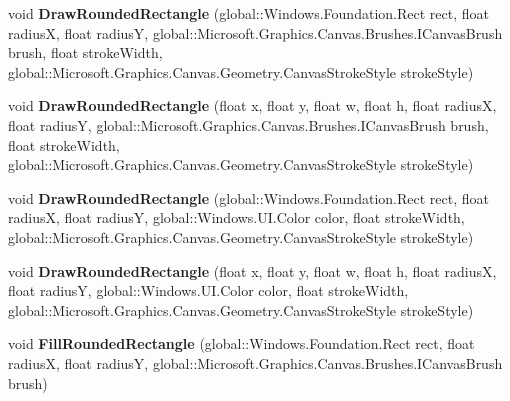 \begin{DoxyCompactItemize}
void {\bfseries Draw\+Rounded\+Rectangle} (global\+::\+Windows.\+Foundation.\+Rect rect, float radiusX, float radiusY, global\+::\+Microsoft.\+Graphics.\+Canvas.\+Brushes.\+I\+Canvas\+Brush brush, float stroke\+Width, global\+::\+Microsoft.\+Graphics.\+Canvas.\+Geometry.\+Canvas\+Stroke\+Style stroke\+Style)
\item 
\mbox{\label{class_microsoft_1_1_graphics_1_1_canvas_1_1_canvas_drawing_session_ab184d8260f42bc55d595aeb5bf73d38d}} 
void {\bfseries Draw\+Rounded\+Rectangle} (float x, float y, float w, float h, float radiusX, float radiusY, global\+::\+Microsoft.\+Graphics.\+Canvas.\+Brushes.\+I\+Canvas\+Brush brush, float stroke\+Width, global\+::\+Microsoft.\+Graphics.\+Canvas.\+Geometry.\+Canvas\+Stroke\+Style stroke\+Style)
\item 
\mbox{\label{class_microsoft_1_1_graphics_1_1_canvas_1_1_canvas_drawing_session_a3756840b08809835506655a6b68d93a3}} 
void {\bfseries Draw\+Rounded\+Rectangle} (global\+::\+Windows.\+Foundation.\+Rect rect, float radiusX, float radiusY, global\+::\+Windows.\+U\+I.\+Color color, float stroke\+Width, global\+::\+Microsoft.\+Graphics.\+Canvas.\+Geometry.\+Canvas\+Stroke\+Style stroke\+Style)
\item 
\mbox{\label{class_microsoft_1_1_graphics_1_1_canvas_1_1_canvas_drawing_session_a39d62df59ebc6f0be49bc088c5acbe6a}} 
void {\bfseries Draw\+Rounded\+Rectangle} (float x, float y, float w, float h, float radiusX, float radiusY, global\+::\+Windows.\+U\+I.\+Color color, float stroke\+Width, global\+::\+Microsoft.\+Graphics.\+Canvas.\+Geometry.\+Canvas\+Stroke\+Style stroke\+Style)
\item 
\mbox{\label{class_microsoft_1_1_graphics_1_1_canvas_1_1_canvas_drawing_session_a92115abad0ee220948573a5bfac164af}} 
void {\bfseries Fill\+Rounded\+Rectangle} (global\+::\+Windows.\+Foundation.\+Rect rect, float radiusX, float radiusY, global\+::\+Microsoft.\+Graphics.\+Canvas.\+Brushes.\+I\+Canvas\+Brush brush)
\item 
\mbox{\label{class_microsoft_1_1_graphics_1_1_canvas_1_1_canvas_drawing_session_a0db169715ac5ba1e5005a265cca78a17}} 

\end{DoxyCompactItemize}
